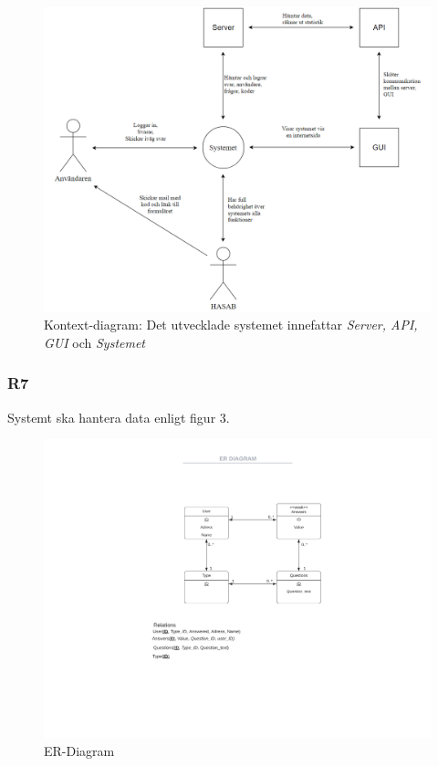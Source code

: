\documentclass{article}
\begin{document}
    \begin{figure}[h!]
    \caption{Kontext-diagram: Det utvecklade systemet innefattar \textit{Server, API, GUI} och \textit{Systemet}}
    \includegraphics[width=150mm]{Kontextdiagram.png}
    
    \end{figure}
    
    \newpage
    \subsubsection*{R7}
    Systemt ska hantera data enligt figur 3.
       \begin{figure}[h!]
    
    \includegraphics[width=150mm]{ERDIAGRAM.png}
    \caption{ER-Diagram}
    \end{figure}
    
\end{document}
